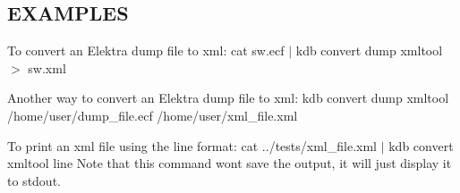 \subsection*{E\+X\+A\+M\+P\+L\+ES}

To convert an Elektra dump file to xml\+: {\ttfamily cat sw.\+ecf $\vert$ kdb convert dump xmltool $>$ sw.\+xml}

Another way to convert an Elektra dump file to xml\+: {\ttfamily kdb convert dump xmltool /home/user/dump\+\_\+file.ecf /home/user/xml\+\_\+file.xml}

To print an xml file using the {\ttfamily line} format\+: {\ttfamily cat ../tests/xml\+\_\+file.xml $\vert$ kdb convert xmltool line} Note that this command won\textquotesingle{}t save the output, it will just display it to {\ttfamily stdout}. 